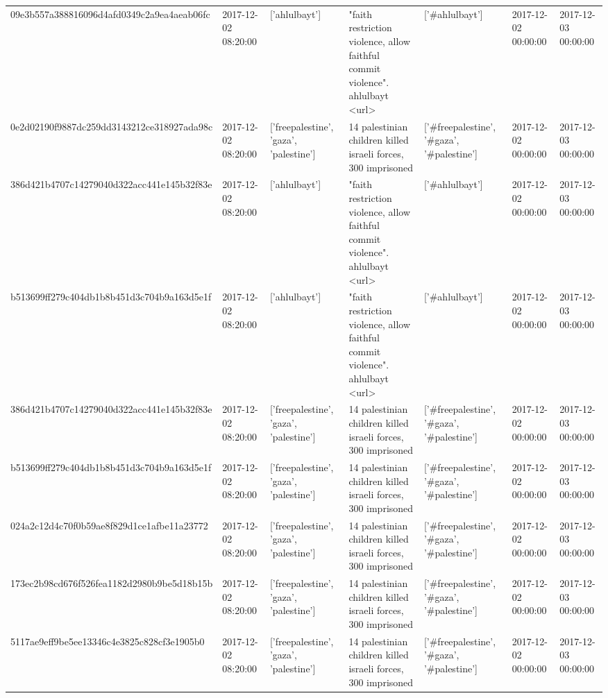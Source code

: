 \begin{tabular}{lllllll}
09e3b557a388816096d4afd0349c2a9ea4aeab06fc & 2017-12-02 08:20:00 & ['ahlulbayt'] & "faith restriction violence, allow faithful commit violence". ahlulbayt <url> & ['#ahlulbayt'] & 2017-12-02 00:00:00 & 2017-12-03 00:00:00 \\
0e2d02190f9887dc259dd3143212ce318927ada98c & 2017-12-02 08:20:00 & ['freepalestine', 'gaza', 'palestine'] & 14 palestinian children killed israeli forces, 300 imprisoned & ['#freepalestine', '#gaza', '#palestine'] & 2017-12-02 00:00:00 & 2017-12-03 00:00:00 \\
386d421b4707c14279040d322acc441e145b32f83e & 2017-12-02 08:20:00 & ['ahlulbayt'] & "faith restriction violence, allow faithful commit violence". ahlulbayt <url> & ['#ahlulbayt'] & 2017-12-02 00:00:00 & 2017-12-03 00:00:00 \\
b513699ff279c404db1b8b451d3c704b9a163d5e1f & 2017-12-02 08:20:00 & ['ahlulbayt'] & "faith restriction violence, allow faithful commit violence". ahlulbayt <url> & ['#ahlulbayt'] & 2017-12-02 00:00:00 & 2017-12-03 00:00:00 \\
386d421b4707c14279040d322acc441e145b32f83e & 2017-12-02 08:20:00 & ['freepalestine', 'gaza', 'palestine'] & 14 palestinian children killed israeli forces, 300 imprisoned & ['#freepalestine', '#gaza', '#palestine'] & 2017-12-02 00:00:00 & 2017-12-03 00:00:00 \\
b513699ff279c404db1b8b451d3c704b9a163d5e1f & 2017-12-02 08:20:00 & ['freepalestine', 'gaza', 'palestine'] & 14 palestinian children killed israeli forces, 300 imprisoned & ['#freepalestine', '#gaza', '#palestine'] & 2017-12-02 00:00:00 & 2017-12-03 00:00:00 \\
024a2c12d4c70f0b59ae8f829d1ce1afbe11a23772 & 2017-12-02 08:20:00 & ['freepalestine', 'gaza', 'palestine'] & 14 palestinian children killed israeli forces, 300 imprisoned & ['#freepalestine', '#gaza', '#palestine'] & 2017-12-02 00:00:00 & 2017-12-03 00:00:00 \\
173ec2b98cd676f526fea1182d2980b9be5d18b15b & 2017-12-02 08:20:00 & ['freepalestine', 'gaza', 'palestine'] & 14 palestinian children killed israeli forces, 300 imprisoned & ['#freepalestine', '#gaza', '#palestine'] & 2017-12-02 00:00:00 & 2017-12-03 00:00:00 \\
5117ae9eff9be5ee13346c4e3825c828cf3e1905b0 & 2017-12-02 08:20:00 & ['freepalestine', 'gaza', 'palestine'] & 14 palestinian children killed israeli forces, 300 imprisoned & ['#freepalestine', '#gaza', '#palestine'] & 2017-12-02 00:00:00 & 2017-12-03 00:00:00 \\

\end{tabular}
